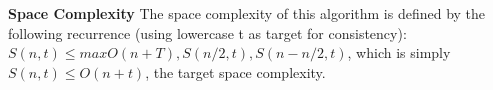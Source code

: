 \documentclass[11pt]{article}
\begin{document}
\begin{solution}
\textbf{Space Complexity}
The space complexity of this algorithm is defined by the following recurrence (using lowercase t as target for consistency): $S(n,t) \leq max{O(n + T), S(n/2, t), S(n - n/2, t)}$, which is simply $S(n,t) \leq O(n + t)$, the target space complexity.

\end{solution}

\clearpage
\end{document}

